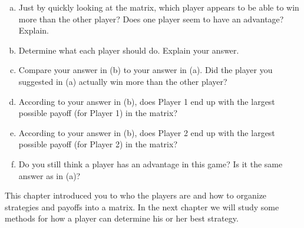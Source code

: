 \begin{xca}
\begin{enumerate}[(a)]
\item Just by quickly looking at the matrix, which player appears to be able to win more than the other player? Does one player seem to have an advantage? Explain.
\item Determine what each player should do. Explain your answer.
\item Compare your answer in (b) to your answer in (a). Did the player you suggested in (a) actually win more than the other player?
\item According to your answer in (b), does Player 1 end up with the largest possible payoff (for Player 1) in the matrix?
\item According to your answer in (b), does Player 2 end up with the largest possible payoff (for Player 2) in the matrix?
\item Do you still think a player has an advantage in this game? Is it the same answer as in (a)?
\end{enumerate}
\end{xca}

\vspace{.5in}

This chapter introduced you to who the players are and how to organize strategies and payoffs into a matrix. In the next chapter we will study some methods for how a player can determine his or her best strategy.

 